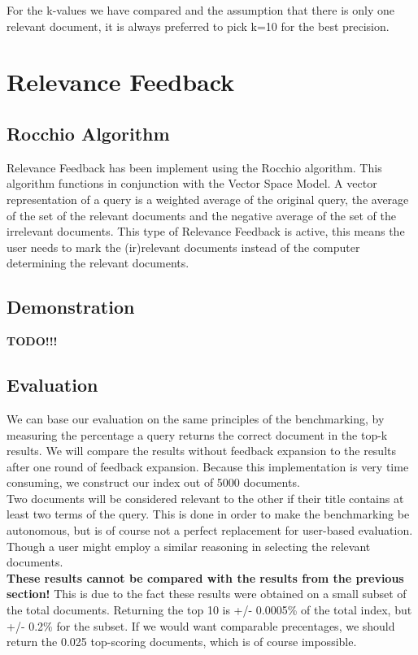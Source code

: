 \documentclass{article}
\begin{document}
For the k-values we have compared and the assumption that there is only one relevant document, it is always preferred to pick k=10 for the best precision.\\

\section{Relevance Feedback}
\subsection{Rocchio Algorithm}
Relevance Feedback has been implement using the Rocchio algorithm. This algorithm functions in conjunction with the Vector Space Model. A vector representation of a query is a weighted average of the original query, the average of the set of the relevant documents and the negative average of the set of the irrelevant documents. This type of Relevance Feedback is active, this means the user needs to mark the (ir)relevant documents instead of the computer determining the relevant documents.

\subsection{Demonstration}
\textbf{TODO!!!}


\subsection{Evaluation}
We can base our evaluation on the same principles of the benchmarking, by measuring the percentage a query returns the correct document in the top-k results. We will compare the results without feedback expansion to the results  after one round of feedback expansion. Because this implementation is very time consuming, we construct our index out of 5000 documents.\\

Two documents will be considered relevant to the other if their title contains at least two terms of the query. This is done in order to make the benchmarking be autonomous, but is of course not a perfect replacement for user-based evaluation. Though a user might employ a similar reasoning in selecting the relevant documents. \\

\textbf{These results cannot be compared with the results from the previous section!} This is due to the fact these results were obtained on a small subset of the total documents. Returning the top 10 is +/- 0.0005\% of the total index, but +/- 0.2\% for the subset. If we would want comparable precentages, we should return the 0.025 top-scoring documents, which is of course impossible. \\
\end{document}
